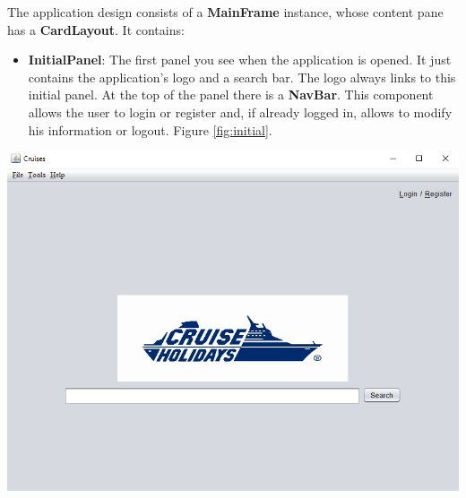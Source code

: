 \documentclass[11pt]{article}
\begin{document}
   	\begin{qn}
	The application design consists of a \textbf{MainFrame} instance, whose content pane has a \textbf{CardLayout}. It contains:
		\begin{itemize}
		    \item \textbf{InitialPanel}: The first panel you see when the application is opened. It just contains the application's  logo and a search bar. The logo always links to this initial panel. At the top of the panel there is a \textbf{NavBar}. This component allows the user to login or register and, if already logged in, allows to modify his information or logout. Figure \ref{fig:initial}.
		\end{itemize}
		\begin{center}
			\begin{minipage}{0.8\linewidth}
			   	\includegraphics[width=\linewidth]{images/initial.png}
			   	\label{fig:initial}
			\end{minipage}
		\end{center}
	\end{qn}
	
\end{document}
